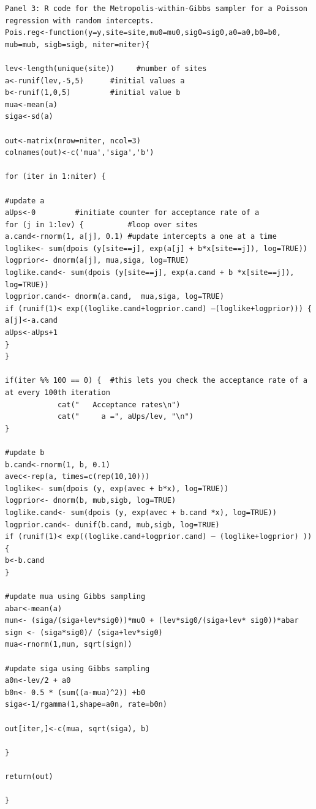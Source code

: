 \begin{verbatim}
Panel 3: R code for the Metropolis-within-Gibbs sampler for a Poisson regression with random intercepts.
Pois.reg<-function(y=y,site=site,mu0=mu0,sig0=sig0,a0=a0,b0=b0, mub=mub, sigb=sigb, niter=niter){

lev<-length(unique(site))     #number of sites
a<-runif(lev,-5,5)		#initial values a
b<-runif(1,0,5)			#initial value b
mua<-mean(a)
siga<-sd(a)

out<-matrix(nrow=niter, ncol=3)	
colnames(out)<-c('mua','siga','b')

for (iter in 1:niter) {

#update a
aUps<-0			#initiate counter for acceptance rate of a
for (j in 1:lev) { 			#loop over sites 
a.cand<-rnorm(1, a[j], 0.1)	#update intercepts a one at a time
loglike<- sum(dpois (y[site==j], exp(a[j] + b*x[site==j]), log=TRUE))  
logprior<- dnorm(a[j], mua,siga, log=TRUE)
loglike.cand<- sum(dpois (y[site==j], exp(a.cand + b *x[site==j]), log=TRUE))
logprior.cand<- dnorm(a.cand,  mua,siga, log=TRUE)
if (runif(1)< exp((loglike.cand+logprior.cand) –(loglike+logprior))) {
a[j]<-a.cand
aUps<-aUps+1
}
}

if(iter %% 100 == 0) {  #this lets you check the acceptance rate of a at every 100th iteration
            cat("   Acceptance rates\n")
            cat("     a =", aUps/lev, "\n")
}

#update b
b.cand<-rnorm(1, b, 0.1)
avec<-rep(a, times=c(rep(10,10)))
loglike<- sum(dpois (y, exp(avec + b*x), log=TRUE))  
logprior<- dnorm(b, mub,sigb, log=TRUE)
loglike.cand<- sum(dpois (y, exp(avec + b.cand *x), log=TRUE))  
logprior.cand<- dunif(b.cand, mub,sigb, log=TRUE)
if (runif(1)< exp((loglike.cand+logprior.cand) – (loglike+logprior) )) {
b<-b.cand
}

#update mua using Gibbs sampling
abar<-mean(a)
mun<- (siga/(siga+lev*sig0))*mu0 + (lev*sig0/(siga+lev* sig0))*abar 
sign <- (siga*sig0)/ (siga+lev*sig0)
mua<-rnorm(1,mun, sqrt(sign))

#update siga using Gibbs sampling
a0n<-lev/2 + a0
b0n<- 0.5 * (sum((a-mua)^2)) +b0
siga<-1/rgamma(1,shape=a0n, rate=b0n)

out[iter,]<-c(mua, sqrt(siga), b)

}

return(out)

}

\end{verbatim}


